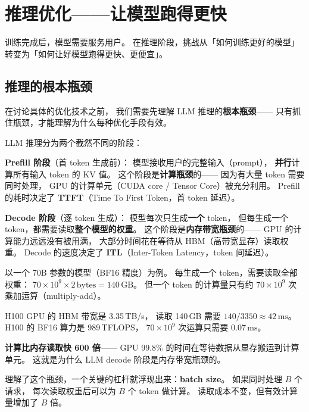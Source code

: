 \chapter{推理优化——让模型跑得更快}
\label{ch:inference}

训练完成后，模型需要服务用户。
在推理阶段，挑战从「如何训练更好的模型」
转变为「如何让好模型跑得更快、更便宜」。

\section{推理的根本瓶颈}

在讨论具体的优化技术之前，
我们需要先理解 LLM 推理的\textbf{根本瓶颈}——
只有抓住瓶颈，才能理解为什么每种优化手段有效。

LLM 推理分为两个截然不同的阶段：

\textbf{Prefill 阶段}（首 token 生成前）：
模型接收用户的完整输入（prompt），
\textbf{并行}计算所有输入 token 的 KV 值。
这个阶段是\textbf{计算瓶颈}的——
因为有大量 token 需要同时处理，
GPU 的计算单元（CUDA core / Tensor Core）被充分利用。
Prefill 的耗时决定了 \textbf{TTFT}（Time To First Token，首 token 延迟）。

\textbf{Decode 阶段}（逐 token 生成）：
模型每次只生成\textbf{一个} token，
但每生成一个 token，都需要读取\textbf{整个模型的权重}。
这个阶段是\textbf{内存带宽瓶颈}的——
GPU 的计算能力远远没有被用满，
大部分时间花在等待从 HBM（高带宽显存）读取权重。
Decode 的速度决定了 \textbf{ITL}（Inter-Token Latency，token 间延迟）。

\begin{whybox}
以一个 70B 参数的模型（BF16 精度）为例。
每生成一个 token，需要读取全部权重：
$70 \times 10^9 \times 2\,\text{bytes} = 140\,\text{GB}$。
但一个 token 的计算量只有约 $70 \times 10^9$ 次乘加运算（multiply-add）。

H100 GPU 的 HBM 带宽是 3.35\,TB/s，
读取 140\,GB 需要 $140 / 3350 \approx 42\,\text{ms}$。
H100 的 BF16 算力是 989\,TFLOPS，
$70 \times 10^9$ 次运算只需要 $0.07\,\text{ms}$。

\textbf{计算比内存读取快 600 倍}——
GPU 99.8\% 的时间在等待数据从显存搬运到计算单元。
这就是为什么 LLM decode 阶段是内存带宽瓶颈的。
\end{whybox}

理解了这个瓶颈，一个关键的杠杆就浮现出来：\textbf{batch size}。
如果同时处理 $B$ 个请求，
每次读取权重后可以为 $B$ 个 token 做计算。
读取成本不变，但有效计算量增加了 $B$ 倍。


